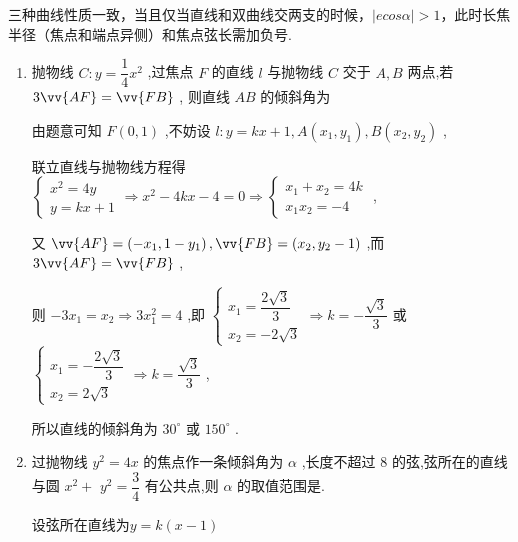     三种曲线性质一致，当且仅当直线和双曲线交两支的时候，$|ecos\alpha| > 1$，此时长焦半径（焦点和端点异侧）和焦点弦长需加负号. 
\begin{enumerate}
    \item 抛物线 $C : y = \dfrac{1}{4}{x}^{2}$ ,过焦点 $F$ 的直线 $l$ 与抛物线 $C$ 交于 $A,B$ 两点,若 $3\vv{AF} = \vv{FB}$ , 则直线 ${AB}$ 的倾斜角为
    \begin{jieda}
        由题意可知 $F\left( {0,1}\right)$ ,不妨设 $l : y = {kx} + 1,A\left( {{x}_{1},{y}_{1}}\right) ,B\left( {{x}_{2},{y}_{2}}\right)$ ,
        
        联立直线与抛物线方程得 $\left\{  \begin{array}{l} {x}^{2} = {4y} \\  y = {kx} + 1 \end{array} \Longrightarrow  {x}^{2} - {4kx} - 4 = 0 \Longrightarrow  \left \{\begin{array}{l}
             {x}_{1} + {x}_{2} = {4k}  \\
             {x}_{1}{x}_{2} =  - 4
        \end{array}\right. \right.$ ,
        
        又 $\vv{AF} = \left( {-{x}_{1},1 - {y}_{1}}\right) ,\vv{FB} = \left( {{x}_{2},{y}_{2} - 1}\right)$ ,而 $3\vv{AF} = \vv{FB}$ ,
        
        则 $- 3{x}_{1} = {x}_{2} \Longrightarrow  3{x}_{1}^{2} = 4$ ,即 $\left\{  {\begin{array}{l} {x}_{1} = \dfrac{2\sqrt{3}}{3} \\  {x}_{2} =  - 2\sqrt{3} \end{array} \Longrightarrow  k =  - \dfrac{\sqrt{3}}{3}}\right.$ 或 $\left\{  {\begin{array}{l} {x}_{1} =  - \dfrac{2\sqrt{3}}{3} \\  {x}_{2} = 2\sqrt{3} \end{array} \Longrightarrow  k = \dfrac{\sqrt{3}}{3}}\right.$ ,
        
        所以直线的倾斜角为 ${30}^{ \circ  }$ 或 ${150}^{ \circ  }$ .
    \end{jieda}
    \item 过抛物线 ${y}^{2} = {4x}$ 的焦点作一条倾斜角为 $\alpha$ ,长度不超过 8 的弦,弦所在的直线与圆 ${x}^{2} +$  ${y}^{2} = \dfrac{3}{4}$ 有公共点,则 $\alpha$ 的取值范围是.
    \begin{jieda}
        设弦所在直线为$y = k(x-1)$
\end{jieda}
\end{enumerate}
